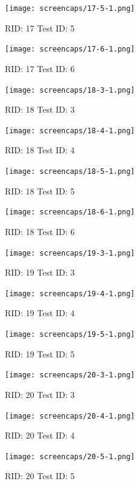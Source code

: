 \documentclass{article}
\begin{document}
\begin{figure}[H]
\texttt{[image: screencaps/17-5-1.png]}
\caption{RID: 17 Test ID: 5}
\end{figure}


\begin{figure}[H]
\texttt{[image: screencaps/17-6-1.png]}
\caption{RID: 17 Test ID: 6}
\end{figure}




\begin{figure}[H]
\texttt{[image: screencaps/18-3-1.png]}
\caption{RID: 18 Test ID: 3}
\end{figure}

\begin{figure}[H]
\texttt{[image: screencaps/18-4-1.png]}
\caption{RID: 18 Test ID: 4}
\end{figure}


\begin{figure}[H]
\texttt{[image: screencaps/18-5-1.png]}
\caption{RID: 18 Test ID: 5}
\end{figure}

\begin{figure}[H]
\texttt{[image: screencaps/18-6-1.png]}
\caption{RID: 18 Test ID: 6}
\end{figure}




\begin{figure}[H]
\texttt{[image: screencaps/19-3-1.png]}
\caption{RID: 19 Test ID: 3}
\end{figure}

\begin{figure}[H]
\texttt{[image: screencaps/19-4-1.png]}
\caption{RID: 19 Test ID: 4}
\end{figure}


\begin{figure}[H]
\texttt{[image: screencaps/19-5-1.png]}
\caption{RID: 19 Test ID: 5}
\end{figure}


\begin{figure}[H]
\texttt{[image: screencaps/20-3-1.png]}
\caption{RID: 20 Test ID: 3}
\end{figure}

\begin{figure}[H]
\texttt{[image: screencaps/20-4-1.png]}
\caption{RID: 20 Test ID: 4}
\end{figure}


\begin{figure}[H]
\texttt{[image: screencaps/20-5-1.png]}
\caption{RID: 20 Test ID: 5}
\end{figure}
\end{document}
